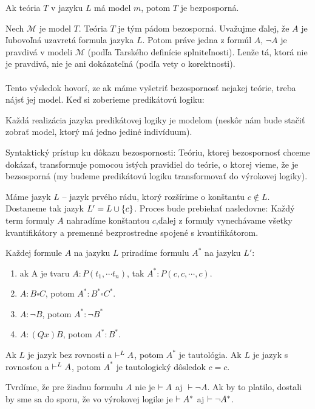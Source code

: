 \begin{dosledok}
    Ak teória $T$ v jazyku $L$ má model $m$, potom $T$ je
    bezposporná.
\end{dosledok}
\begin{dokaz}
    Nech $\mathcal{M}$ je model $T$. Teória $T$ je tým pádom
    bezosporná. Uvažujme ďalej, že $A$ je ľubovoľná uzavretá formula jazyka $L$.
    Potom práve jedna z formúl $A$, $\neg A$ je pravdivá v modeli
    $\mathcal{M}$
    (podľa Tarského definície splniteľnosti).
    Lenže tá, ktorá nie je pravdivá, nie je ani dokázateľná 
    (podľa vety o korektnosti).
\end{dokaz}

\startFIXME
\paragraph{}
\par Tento výsledok hovorí, ze ak máme vyšetriť bezospornosť nejakej teórie,
treba nájsť jej model. Keď si zoberieme predikátovú logiku:

\par Každá realizácia jazyka predikátovej logiky je modelom (neskôr nám bude
stačiť zobrať model, ktorý má jedno jediné indivíduum).

\par
Syntaktický prístup ku dôkazu bezospornosti: Teóriu, ktorej bezospornosť chceme
dokázať, transformuje pomocou istých pravidiel do teórie, o ktorej vieme, že je
bezsosporná  (my budeme predikátovú logiku transformovať do výrokovej logiky).

\begin{priklad}
    Máme jazyk $L$ -- jazyk prvého rádu, ktorý rozšírime o konštantu $c \notin L$.
    Dostaneme tak jazyk $L' = L \cup \{c\}$.
    Proces \fixme{} bude prebiehať nasledovne:
    Každý term formuly $A$ nahradíme konštantou $c$,ďalej  z formuly
    vynechávame všetky kvantifikátory a premenné bezprostredne spojené s
    kvantifikátorom.

    Každej formule $A$ na jazyku $L$ priradíme formulu $A^*$ na jazyku $L'$:
    \begin{enumerate}
            \item ak A je tvaru $A: P(t_1, \cdots t_n)$, tak $A^*: P(c, c, \cdots,c)$.
            \item $A: B \square C$, potom $A^*: B^* \square C^*$.
            \item $A: \neg B$, potom $A^*: \neg B^*$
            \item $A: (Qx) B$, potom $A^*: B^*$.
    \end{enumerate}

Ak $L$ je jazyk bez rovnosti a $\vdash^L A$, potom $A^*$ je tautológia. Ak $L$
je jazyk s rovnosťou a $\vdash^L A$, potom $A^*$ je tautologický dôsledok $c=c$.

\par Tvrdíme, že pre žiadnu formulu $A$ nie je $\vdash A$ aj $\vdash \neg A$. Ak
by to platilo, dostali by sme sa do sporu, že vo výrokovej logike je $\vdash
A^*$ aj $\vdash \neg A^*$.
\end{priklad}

\stopFIXME
